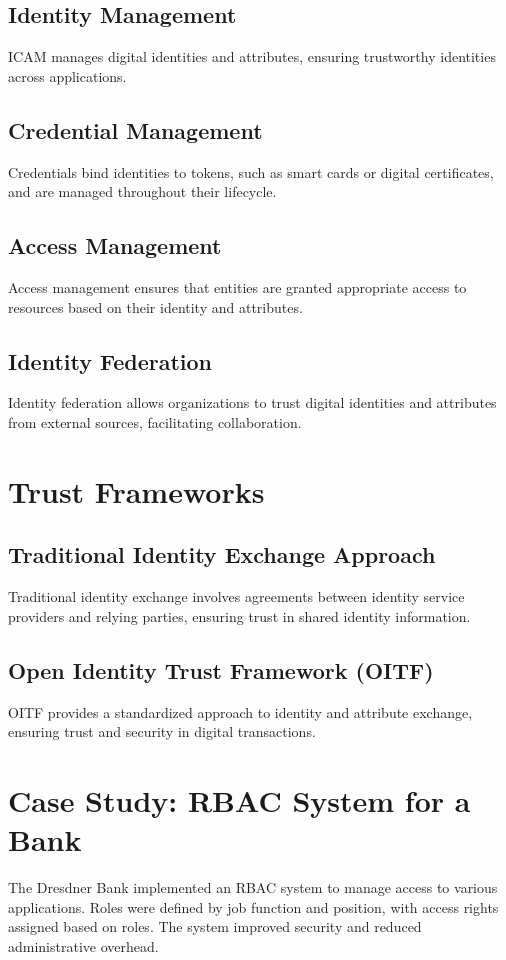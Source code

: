 \documentclass{article}
\begin{document}
\subsection{Identity Management}
ICAM manages digital identities and attributes, ensuring trustworthy identities across applications.

\subsection{Credential Management}
Credentials bind identities to tokens, such as smart cards or digital certificates, and are managed throughout their lifecycle.

\subsection{Access Management}
Access management ensures that entities are granted appropriate access to resources based on their identity and attributes.

\subsection{Identity Federation}
Identity federation allows organizations to trust digital identities and attributes from external sources, facilitating collaboration.

\section{Trust Frameworks}
\subsection{Traditional Identity Exchange Approach}
Traditional identity exchange involves agreements between identity service providers and relying parties, ensuring trust in shared identity information.

\subsection{Open Identity Trust Framework (OITF)}
OITF provides a standardized approach to identity and attribute exchange, ensuring trust and security in digital transactions.

\section{Case Study: RBAC System for a Bank}
The Dresdner Bank implemented an RBAC system to manage access to various applications. Roles were defined by job function and position, with access rights assigned based on roles. The system improved security and reduced administrative overhead.
\end{document}

